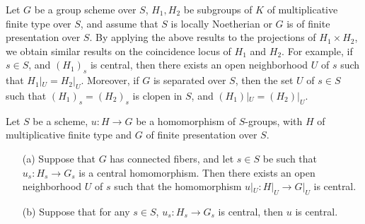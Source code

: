 \begin{remark}\label{scheme subgroup multiplicative coincidence locus prop}
Let $G$ be a group scheme over $S$, $H_1,H_2$ be subgroups of $K$ of multiplicative finite type over $S$, and assume that $S$ is locally Noetherian or $G$ is of finite presentation over $S$. By applying the above results to the projections of $H_1\times H_2$, we obtain similar results on the coincidence locus of $H_1$ and $H_2$. For example, if $s\in S$, and $(H_1)_s$ is central, then there exists an open neighborhood $U$ of $s$ such that $H_1|_U=H_2|_U$. Moreover, if $G$ is separated over $S$, then the set $U$ of $s\in S$ such that $(H_1)_s=(H_2)_s$ is clopen in $S$, and $(H_1)|_U=(H_2)|_U$.
\end{remark}

\begin{theorem}\label{scheme group multiplicative morphism central at fiber prop}
Let $S$ be a scheme, $u:H\to G$ be a homomorphism of $S$-groups, with $H$ of multiplicative finite type and $G$ of finite presentation over $S$.
\begin{enumerate}
    \item[(a)] Suppose that $G$ has connected fibers, and let $s\in S$ be such that $u_s:H_s\to G_s$ is a central homomorphism. Then there exists an open neighborhood $U$ of $s$ such that the homomorphism $u|_U:H|_U\to G|_U$ is central.
    \item[(b)] Suppose that for any $s\in S$, $u_s:H_s\to G_s$ is central, then $u$ is central. 
\end{enumerate}
\end{theorem}
